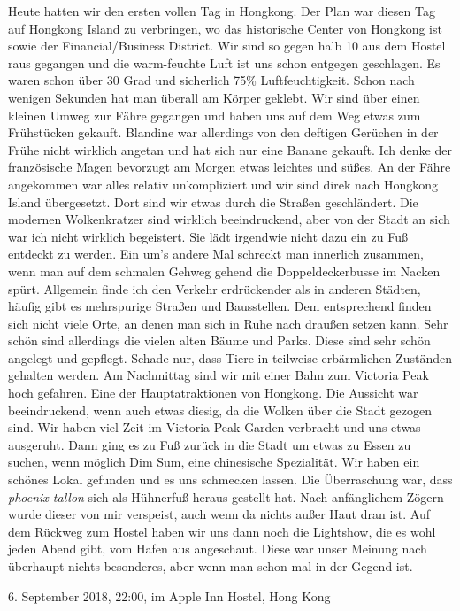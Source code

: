 \documentclass[11pt]{book}
\begin{document}
Heute hatten wir den ersten vollen Tag in Hongkong. Der Plan war diesen Tag auf Hongkong Island zu verbringen, 
wo das historische Center von Hongkong ist sowie der Financial/Business District. Wir sind so gegen halb 
10 aus dem Hostel raus gegangen und die warm-feuchte Luft ist uns schon entgegen geschlagen. Es waren schon 
über 30 Grad und sicherlich 75\% Luftfeuchtigkeit. Schon nach wenigen Sekunden hat man überall am Körper 
geklebt. Wir sind über einen kleinen Umweg zur Fähre gegangen und haben uns auf dem Weg etwas zum Frühstücken 
gekauft. Blandine war allerdings von den deftigen Gerüchen in der Frühe nicht wirklich angetan und hat sich 
nur eine Banane gekauft. Ich denke der französische Magen bevorzugt am Morgen etwas leichtes und süßes. 
An der Fähre angekommen war alles relativ unkompliziert und wir sind direk nach Hongkong Island übergesetzt. 
Dort sind wir etwas durch die Straßen geschländert. Die modernen Wolkenkratzer sind wirklich beeindruckend, 
aber von der Stadt an sich war ich nicht wirklich begeistert. Sie lädt irgendwie nicht dazu ein zu Fuß 
entdeckt zu werden. Ein um's andere Mal schreckt man innerlich zusammen, wenn man auf dem schmalen Gehweg 
gehend die Doppeldeckerbusse im Nacken spürt. Allgemein finde ich den Verkehr erdrückender als in anderen 
Städten, häufig gibt es mehrspurige Straßen und Bausstellen. Dem entsprechend finden sich nicht viele Orte, 
an denen man sich in Ruhe nach draußen setzen kann. Sehr schön sind allerdings die vielen alten Bäume und 
Parks. Diese sind sehr schön angelegt und gepflegt. Schade nur, dass Tiere in teilweise erbärmlichen 
Zuständen gehalten werden. 
Am Nachmittag sind wir mit einer Bahn zum Victoria Peak hoch gefahren. Eine der Hauptatraktionen von 
Hongkong. Die Aussicht war beeindruckend, wenn auch etwas diesig, da die Wolken über die Stadt gezogen sind.
Wir haben viel Zeit im Victoria Peak Garden verbracht und uns etwas ausgeruht. Dann ging es zu Fuß zurück 
in die Stadt um etwas zu Essen zu suchen, wenn möglich Dim Sum, eine chinesische Spezialität. Wir haben 
ein schönes Lokal gefunden und es uns schmecken lassen. Die Überraschung war, dass \emph{phoenix tallon} 
sich als Hühnerfuß heraus gestellt hat. Nach anfänglichem Zögern wurde dieser von mir verspeist, auch wenn 
da nichts außer Haut dran ist. 
Auf dem Rückweg zum Hostel haben wir uns dann noch die Lightshow, die es wohl jeden Abend gibt, vom Hafen aus 
angeschaut. Diese war unser Meinung nach überhaupt nichts besonderes, aber wenn man schon mal in der Gegend ist.

6. September 2018, 22:00, im Apple Inn Hostel, Hong Kong
\end{document}
